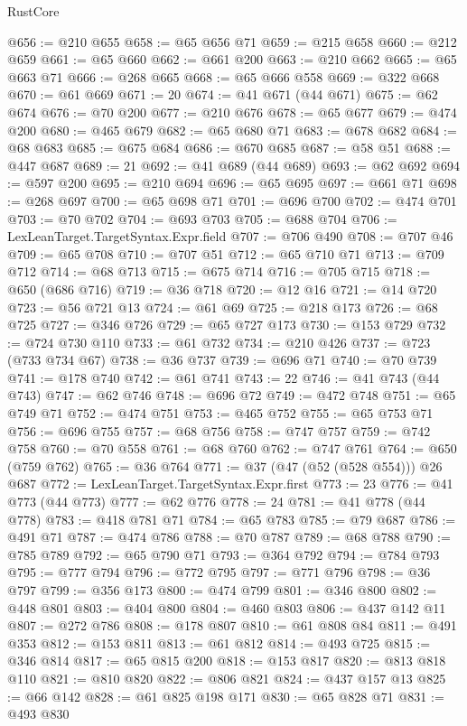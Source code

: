 \begin{lexlean}{RustCore}
\begin{coremodule}
@656 := @210 @655
@658 := @65 @656 @71
@659 := @215 @658
@660 := @212 @659
@661 := @65 @660
@662 := @661 @200
@663 := @210 @662
@665 := @65 @663 @71
@666 := @268 @665
@668 := @65 @666 @558
@669 := @322 @668
@670 := @61 @669
@671 := 20
@674 := @41 @671 (@44 @671)
@675 := @62 @674
@676 := @70 @200
@677 := @210 @676
@678 := @65 @677
@679 := @474 @200
@680 := @465 @679
@682 := @65 @680 @71
@683 := @678 @682
@684 := @68 @683
@685 := @675 @684
@686 := @670 @685
@687 := @58 @51
@688 := @447 @687
@689 := 21
@692 := @41 @689 (@44 @689)
@693 := @62 @692
@694 := @597 @200
@695 := @210 @694
@696 := @65 @695
@697 := @661 @71
@698 := @268 @697
@700 := @65 @698 @71
@701 := @696 @700
@702 := @474 @701
@703 := @70 @702
@704 := @693 @703
@705 := @688 @704
@706 := LexLeanTarget.TargetSyntax.Expr.field
@707 := @706 @490
@708 := @707 @46
@709 := @65 @708
@710 := @707 @51
@712 := @65 @710 @71
@713 := @709 @712
@714 := @68 @713
@715 := @675 @714
@716 := @705 @715
@718 := @650 (@686 @716)
@719 := @36 @718
@720 := @12 @16
@721 := @14 @720
@723 := @56 @721 @13
@724 := @61 @69
@725 := @218 @173
@726 := @68 @725
@727 := @346 @726
@729 := @65 @727 @173
@730 := @153 @729
@732 := @724 @730 @110
@733 := @61 @732
@734 := @210 @426
@737 := @723 (@733 @734 @67)
@738 := @36 @737
@739 := @696 @71
@740 := @70 @739
@741 := @178 @740
@742 := @61 @741
@743 := 22
@746 := @41 @743 (@44 @743)
@747 := @62 @746
@748 := @696 @72
@749 := @472 @748
@751 := @65 @749 @71
@752 := @474 @751
@753 := @465 @752
@755 := @65 @753 @71
@756 := @696 @755
@757 := @68 @756
@758 := @747 @757
@759 := @742 @758
@760 := @70 @558
@761 := @68 @760
@762 := @747 @761
@764 := @650 (@759 @762)
@765 := @36 @764
@771 := @37 (@47 (@52 (@528 @554))) @26 @687
@772 := LexLeanTarget.TargetSyntax.Expr.first
@773 := 23
@776 := @41 @773 (@44 @773)
@777 := @62 @776
@778 := 24
@781 := @41 @778 (@44 @778)
@783 := @418 @781 @71
@784 := @65 @783
@785 := @79 @687
@786 := @491 @71
@787 := @474 @786
@788 := @70 @787
@789 := @68 @788
@790 := @785 @789
@792 := @65 @790 @71
@793 := @364 @792
@794 := @784 @793
@795 := @777 @794
@796 := @772 @795
@797 := @771 @796
@798 := @36 @797
@799 := @356 @173
@800 := @474 @799
@801 := @346 @800
@802 := @448 @801
@803 := @404 @800
@804 := @460 @803
@806 := @437 @142 @11
@807 := @272 @786
@808 := @178 @807
@810 := @61 @808 @84
@811 := @491 @353
@812 := @153 @811
@813 := @61 @812
@814 := @493 @725
@815 := @346 @814
@817 := @65 @815 @200
@818 := @153 @817
@820 := @813 @818 @110
@821 := @810 @820
@822 := @806 @821
@824 := @437 @157 @13
@825 := @66 @142
@828 := @61 @825 @198 @171
@830 := @65 @828 @71
@831 := @493 @830

\end{coremodule}
\end{lexlean}
